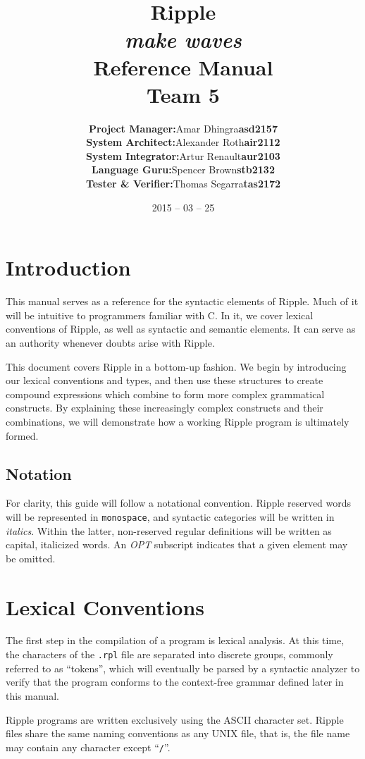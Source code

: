 \documentclass{article}
\title{\vspace{5cm}Ripple \\ {\large\it make waves} \\ Reference Manual \\ Team 5}
\author{\begin{tabular}{rcl}
\textbf{Project Manager:}    &   Amar Dhingra   &   \textbf{asd2157} \\
\textbf{System Architect:}   &   Alexander Roth &   \textbf{air2112} \\
\textbf{System Integrator:}  &   Artur Renault  &   \textbf{aur2103} \\
\textbf{Language Guru:}      &   Spencer Brown  &   \textbf{stb2132} \\
\textbf{Tester \& Verifier:} &   Thomas Segarra &   \textbf{tas2172}
\end{tabular}}
\date{2015 -- 03 -- 25}
\newcommand{\code}{\texttt}
\begin{document}
\setcounter{tocdepth}{2}

\maketitle
\newpage
\tableofcontents
\newpage

\section{Introduction}
This manual serves as a reference for the syntactic elements of Ripple. Much of it will be intuitive to programmers familiar with C. In it, we cover lexical conventions of Ripple, as well as syntactic and semantic elements. It can serve as an authority whenever doubts arise with Ripple.

This document covers Ripple in a bottom-up fashion. We begin by introducing our lexical conventions and types, and then use these structures to create compound expressions which combine to form more complex grammatical constructs. By explaining these increasingly complex constructs and their combinations, we will demonstrate how a working Ripple program is ultimately formed.

\subsection{Notation}
For clarity, this guide will follow a notational convention. Ripple reserved words will be represented in \code{monospace}, and syntactic categories will be written in \emph{italics}. Within the latter, non-reserved regular definitions will be written as capital, italicized words. An \emph{OPT} subscript indicates that a given element may be omitted.

\section{Lexical Conventions}
The first step in the compilation of a program is lexical analysis. At this time, the characters of the \code{.rpl} file are separated into discrete groups, commonly referred to as ``tokens'', which will eventually be parsed by a syntactic analyzer to verify that the program conforms to the context-free grammar defined later in this manual.

Ripple programs are written exclusively using the ASCII character set. Ripple files share the same naming conventions as any UNIX file, that is, the file name may contain any character except ``\code{/}''.
\end{document}
